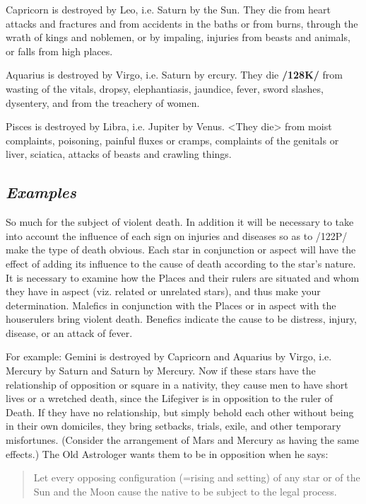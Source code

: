 Capricorn is destroyed by Leo, i.e. Saturn by the Sun. They die from heart attacks and fractures and from accidents in the baths or from burns, through the wrath of kings and noblemen, or by impaling, injuries from beasts and animals, or falls from high places.

Aquarius \mn{\Aquarius} is destroyed by Virgo, i.e. Saturn by ercury. They die \textbf{/128K/} from wasting of the vitals, dropsy, elephantiasis, jaundice, fever, sword slashes, dysentery, and from the treachery of women.

Pisces \mn{\Pisces} is destroyed by Libra, i.e. Jupiter by Venus. <They die> from moist complaints, poisoning, painful fluxes or cramps, complaints of the genitals or liver, sciatica, attacks of beasts and crawling things.

\subsection{\textit{Examples}}
So much for the subject of violent death. In addition it will be necessary to take into account the influence of each sign on injuries and diseases so as to /122P/ make the type of death obvious. Each star in conjunction or aspect will have the effect of adding its influence to the cause of death according to the star’s nature. It is necessary to examine how the Places and their rulers are situated and whom they have in
aspect (viz. related or unrelated stars), and thus make your determination. Malefics in conjunction with the Places or in aspect with the houserulers bring violent death. Benefics indicate the cause to be distress, injury, disease, or an attack of fever. 

For example: Gemini is destroyed by Capricorn and Aquarius by Virgo, i.e. Mercury by Saturn and Saturn by Mercury. Now if these stars have the relationship of opposition or square in a nativity, they cause men to have short lives or a wretched death, since the Lifegiver is in opposition to the ruler of Death. If they have no relationship, but simply behold each other without being in their own domiciles, they bring setbacks, trials, exile, and other temporary misfortunes. (Consider the arrangement of Mars and Mercury as having the same effects.) The Old Astrologer wants them to be in opposition when he says: \begin{quote}Let every opposing configuration (=rising and setting) of any star or of the Sun and the Moon cause the native to be subject to the legal process.\end{quote}

